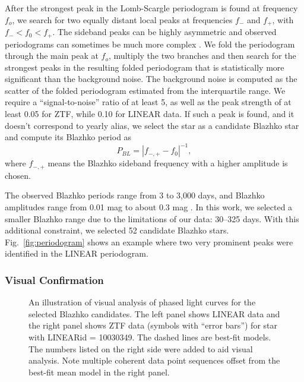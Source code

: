After the strongest peak in the Lomb-Scargle periodogram is found at frequency $f_o$, we search for  two equally
distant local peaks at frequencies $f_-$ and $f_+$, with $f_- < f_0 < f_+$.  The sideband peaks can be highly asymmetric
\cite{2003ApJ...598..597A} and observed periodograms can sometimes be much more complex \cite{2007MNRAS.377.1263S}.  
We fold the periodogram through the main peak at $f_o$, multiply the two branches and then search for the strongest peaks
in the resulting folded periodogram that is statistically more significant than the background noise. The background noise
is computed as the scatter of the folded periodogram estimated from the interquartile range. We require a ``signal-to-noise''
ratio of at least 5, as well as the peak strength of at least 0.05 for ZTF, while 0.10 for LINEAR data. 
If such a peak is found,
and it doesn't correspond to yearly alias, we select the star as a candidate Blazhko star and compute
its Blazhko period as 
\begin{equation*}
P_{BL} = |f_{-,+} - f_0|^{-1},
\end{equation*}
where $f_{-,+}$ means the Blazhko sideband frequency with a higher amplitude is chosen. 

The observed Blazhko periods range from 3 to 3,000 days, and Blazhko amplitudes range from 0.01 mag to about 0.3 mag \citep{2007MNRAS.377.1263S}. In this work, we selected a smaller Blazhko range due to the limitations of our data: 30--325 days. 
With this additional constraint, we selected 52 candidate Blazhko stars. 
Fig.~\ref{fig:periodogram} shows an example where two very prominent peaks were identified in the LINEAR periodogram. 



\subsubsection{Visual Confirmation}

\begin{figure}[ht]
  \centering
  \caption{An illustration of visual analysis of phased light curves for the selected Blazhko candidates. The left
    panel shows LINEAR data and the right panel shows ZTF data
    (symbols with ``error bars'') for star with LINEARid = 10030349. The dashed
    lines are best-fit models. The numbers listed on the right side were added to aid  visual analysis. Note
    multiple coherent data point sequences offset from the best-fit mean model in the right panel.}
       \label{fig:phase1}
\end{figure}


